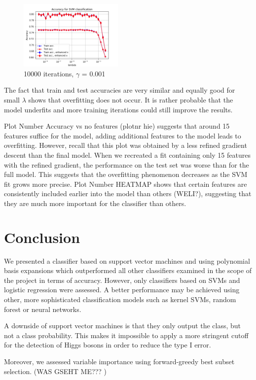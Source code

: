 \documentclass[10pt,conference,compsocconf]{IEEEtran}
\begin{document}
\begin{figure}[H]
	\centering
	\includegraphics[width=0.45\textwidth]{accuracy_SVM.png}
	\caption{10000 iterations, $\gamma$ = 0.001}
\end{figure}

The fact that train and test accuracies are very similar and equally good for small $\lambda$ shows that overfitting does not occur. It is rather probable that the model underfits and more training iterations could still improve the results.

\par
Plot Number Accuracy vs no features (plotnr hie) suggests that around 15 features suffice for the model, adding additional features to the model leads to overfitting. However, recall that this plot was obtained by a less refined gradient descent than the final model. When we recreated a fit containing only 15 features with the refined gradient, the performance on the test set was worse than for the full model. This suggests that the overfitting phenomenon decreases as the SVM fit grows more precise.
Plot Number HEATMAP shows that certain features are consistently included earlier into the model than others (WELI?), suggesting that they are much more important for the classifier than others. 
\section*{Conclusion}
We presented a classifier based on support vector machines and using polynomial basis expansions which outperformed all other classifiers examined in the scope of the project in terms of accuracy. However, only classifiers based on SVMs and logistic regression were assessed. A better performance may be achieved using other, more sophisticated classification models such as kernel SVMs, random forest or neural networks. 
\par
A downside of support vector machines is that they only output the class, but not a class probability. This makes it impossible to apply a more stringent cutoff for the detection of Higgs bosons in order to reduce the type I error. 
\par
Moreover, we assessed variable importance using forward-greedy best subset selection. (WAS GSEHT ME??? ) 


\end{document}
